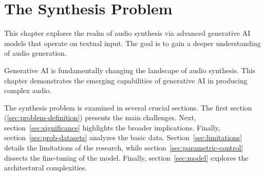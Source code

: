 \chapter{The Synthesis Problem}\label{chap:problem}

\minitoc

This chapter explores the realm of audio synthesis via advanced generative \ac{AI} models that operate on textual input. The goal is to gain a deeper understanding of audio generation.

Generative \ac{AI} is fundamentally changing the landscape of audio synthesis. This chapter demonstrates the emerging capabilities of generative \ac{AI} in producing complex audio.

The synthesis problem is examined in several crucial sections. The first section (\ref{sec:problem-definition}) presents the main challenges. Next, section~\ref{sec:significance} highlights the broader implications. Finally, section~\ref{sec:prob-datasets} analyzes the basic data. Section~\ref{sec:limitations} details the limitations of the research, while section~\ref{sec:parametric-control} dissects the fine-tuning of the model. Finally, section~\ref{sec:model} explores the architectural complexities.







